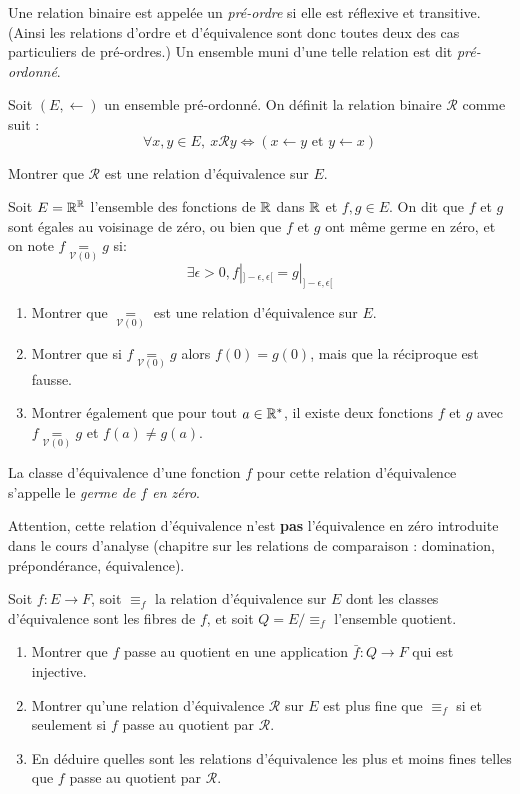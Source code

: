\dotfill

\begin{exercice}
Une relation binaire est appelée un \emph{pré-ordre} si elle est réflexive et transitive. (Ainsi les relations d'ordre et d'équivalence sont donc toutes deux des cas particuliers de pré-ordres.) Un ensemble muni d'une telle relation est dit \emph{pré-ordonné}.

Soit $(E,\leftarrow)$ un ensemble pré-ordonné. On définit la relation binaire $\mathcal R$ comme suit : 
\[ \forall x, y \in E, \: x\mathcal R y \iff (x\leftarrow y \text{ et } y\leftarrow x)\]

Montrer que $\mathcal R$ est une relation d'équivalence sur $E$.
\end{exercice}


\begin{exercice}
\newcommand\memegerme{\operatorname{\underset{{\scriptscriptstyle\mathcal V(0)}}{=}}}
Soit $E=\mathbb{R}^{\mathbb{R}}$ l'ensemble des fonctions de $\mathbb{R}$ dans $\mathbb{R}$ et $f, g\in E$. On dit que $f$ et $g$ sont égales au voisinage de zéro, ou bien que $f$ et $g$ ont même germe en zéro, et on note $f \memegerme g$ si:
\[  \exists \epsilon>0, f|_{]-\epsilon,\epsilon[} = g|_{]-\epsilon,\epsilon[} \]
\begin{enumerate}
\item Montrer que $\memegerme$ est une relation d'équivalence sur $E$.
\item Montrer  que si $f \memegerme g$ alors $f(0)=g(0)$, mais que la réciproque est fausse.
\item Montrer également que pour tout $a\in \mathbb{R}^*$, il existe deux fonctions $f$ et $g$ avec $f \memegerme g$ et $f(a)\neq g(a)$.
\end{enumerate}

La classe d'équivalence d'une fonction $f$ pour cette relation d'équivalence s'appelle le \emph{germe de $f$ en zéro}.

Attention, cette relation d'équivalence n'est \textbf{pas} l'équivalence en zéro introduite dans le cours d'analyse (chapitre sur les relations de comparaison : domination, prépondérance, équivalence).
\end{exercice}



\begin{exercice}
Soit $f : E\to F$, soit $\equiv_f$ la relation d'équivalence sur $E$ dont les classes d'équivalence sont les fibres de $f$, et soit $Q = E/\equiv_f$ l'ensemble quotient. 

\begin{enumerate}
\item Montrer que $f$ passe au quotient en une application $\bar f : Q\to F$ qui est injective.
\item Montrer qu'une relation d'équivalence $\mathcal R$ sur $E$ est plus fine que $\equiv_f$ si et seulement si $f$ passe au quotient par $\mathcal R$.
\item En déduire quelles sont les relations d'équivalence les plus et moins fines telles que $f$ passe au quotient par $\mathcal R$.
\end{enumerate}
\end{exercice}

